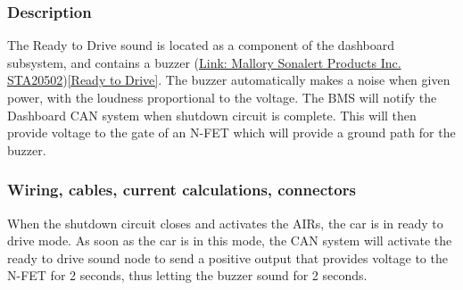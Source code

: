 \documentclass{article}
\begin{document}
\subsubsection{Description}
The Ready to Drive sound is located as a component of the dashboard subsystem, and contains a buzzer (\href{http://www.mallory-sonalert.com/specifications/STA20502.PDF}{Link: Mallory Sonalert Products Inc. STA20502})\ref{Ready to Drive}. The buzzer automatically makes a noise when given power, with the loudness proportional
to the voltage. The BMS will notify the Dashboard CAN system when shutdown circuit is complete. This will then provide voltage to the gate of an N-FET which will provide a ground path for the buzzer.
\subsubsection{Wiring, cables, current calculations, connectors}
When the shutdown circuit closes and activates the AIRs, the car is in ready to drive mode. As soon as the
car is in this mode, the CAN system will activate the ready to drive sound node to send a positive output
that provides voltage to the N-FET for 2 seconds, thus letting the buzzer sound for 2 seconds. 
\end{document}
